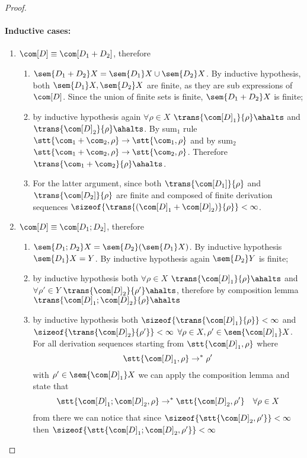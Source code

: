\begin{proof}
  \paragraph*{Inductive cases:\\}
  \begin{enumerate}
  \item \(\com[D]\equiv \com[D_1 + D_2]\), therefore
    \begin{enumerate}[label=(\roman*).]
    \item \(\sem{D_1 + D_2} X = \sem{D_1}X \cup \sem{D_2}X\). By
      inductive hypothesis, both \(\sem{D_1}X, \sem{D_2}X\) are
      finite, as they are sub expressions of \(\com[D]\). Since the
      union of finite sets is finite, \(\sem{D_1 + D_2}X\) is finite;
    \item by inductive hypothesis again \(\forall \rho \in X\)
      \(\trans{\com[D]_1}{\rho}\ahalts\) and
      \(\trans{\com[D]_2}{\rho}\ahalts\). By sum\(_1\) rule
      \(\stt{\com_1 + \com_2, \rho} \to \stt{\com_1, \rho}\) and by
      sum\(_2\)
      \(\stt{\com_1 + \com_2, \rho} \to \stt{\com_2,
        \rho}\). Therefore \(\trans{\com_1 + \com_2}{\rho}\ahalts\).
    \item For the latter argument, since both
      \(\trans{\com[D_1]}{\rho}\) and \(\trans{\com[D_2]}{\rho}\) are
      finite and composed of finite derivation sequences
      \(\sizeof{\trans{(\com[D]_1 + \com[D]_2)}{\rho}} < \infty\).
    \end{enumerate}
  \item \(\com[D]\equiv \com[D_1; D_2]\), therefore
    \begin{enumerate}[label=(\roman*).]
    \item \(\sem{D_1;D_2}X = \sem{D_2}(\sem{D_1}X)\). By inductive
      hypothesis \(\sem{D_1}X = Y\). By inductive hypothesis again
      \(\sem{D_2}Y\) is finite;
    \item by inductive hypothesis both \(\forall \rho \in X\)
      \(\trans{\com[D]_1}{\rho}\ahalts\) and \(\forall \rho' \in Y\)
      \(\trans{\com[D]_2}{\rho'}\ahalts\), therefore by composition
      lemma \(\trans{\com[D]_1;\com[D]_2}{\rho} \ahalts\)
    \item by inductive hypothesis both
      \(\sizeof{\trans{\com[D]_1}{\rho}} < \infty\) and
      \(\sizeof{\trans{\com[D]_2}{\rho'}} < \infty\)
      \(\forall \rho \in X, \rho'\in \sem{\com[D]_1}X\). For all
      derivation sequences starting from \(\stt{\com[D]_1, \rho}\)
      where \[\stt{\com[D]_1, \rho} \to^* \rho'\] with
      \(\rho'\in \sem{\com[D]_1}X\) we can apply the composition lemma
      and state that
      \[\stt{\com[D]_1;\com[D]_2, \rho} \to^* \stt{\com[D]_2, \rho'} \quad
        \forall \rho \in X\] from there we can notice that since
      \(\sizeof{\stt{\com[D]_2, \rho'}} < \infty\) then
      \(\sizeof{\stt{\com[D]_1;\com[D]_2, \rho'}} < \infty\)
    \end{enumerate}
  \end{enumerate}
\end{proof}

